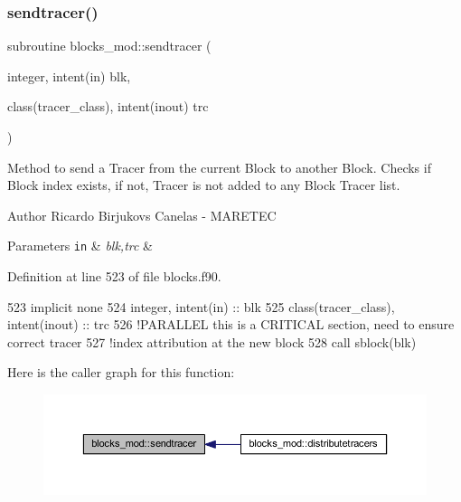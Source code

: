 \subsubsection{\texorpdfstring{sendtracer()}{sendtracer()}}
{\footnotesize\ttfamily subroutine blocks\+\_\+mod\+::sendtracer (\begin{DoxyParamCaption}\item[{integer, intent(in)}]{blk,  }\item[{class(tracer\+\_\+class), intent(inout)}]{trc }\end{DoxyParamCaption})\hspace{0.3cm}{\ttfamily [private]}}



Method to send a Tracer from the current Block to another Block. Checks if Block index exists, if not, Tracer is not added to any Block Tracer list. 

\begin{DoxyAuthor}{Author}
Ricardo Birjukovs Canelas -\/ M\+A\+R\+E\+T\+EC 
\end{DoxyAuthor}

\begin{DoxyParams}[1]{Parameters}
\mbox{\tt in}  & {\em blk,trc} & \\
\hline
\end{DoxyParams}


Definition at line 523 of file blocks.\+f90.


\begin{DoxyCode}
523     \textcolor{keywordtype}{implicit none}
524     \textcolor{keywordtype}{integer}, \textcolor{keywordtype}{intent(in)} :: blk
525     \textcolor{keywordtype}{class}(tracer\_class), \textcolor{keywordtype}{intent(inout)} :: trc
526     \textcolor{comment}{!PARALLEL this is a CRITICAL section, need to ensure correct tracer}
527     \textcolor{comment}{!index attribution at the new block}
528     \textcolor{keyword}{call }sblock(blk)%
\end{DoxyCode}
Here is the caller graph for this function\+:\nopagebreak
\begin{figure}[H]
\begin{center}
\leavevmode
\includegraphics[width=350pt]{namespaceblocks__mod_a5a9992de40470e417ec8e40e688f6a0e_icgraph}
\end{center}
\end{figure}
\mbox{\label{namespaceblocks__mod_a8f5a5d9e6cfd16cfd1b179092a204696}} 
